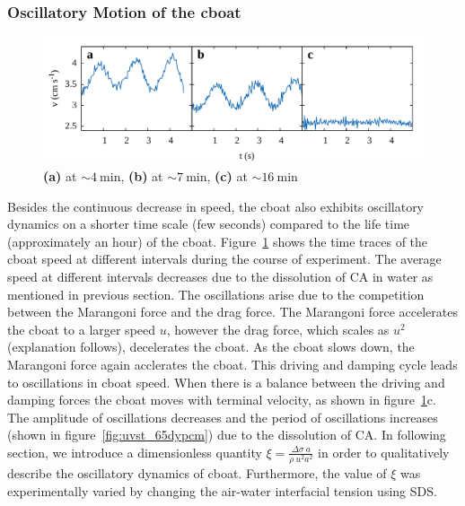 \documentclass[journal=langd5, manuscript=article, layout=twocolumn]{achemso}
\begin{document}
\subsubsection{Oscillatory Motion of the cboat}
\label{sec:oscboat}
\begin{figure}[ht]
	\centering
	\includegraphics[width=\textwidth]{uvst_72dypcm.pdf}
	\caption{{\bf (a)} at $\sim 4\ \mathrm{min}$, {\bf (b)} at $\sim 7\ \mathrm{min}$, {\bf (c)} at $\sim 16\ \mathrm{min}$}
\label{fig:uvst_72dypcm}
\end{figure}
Besides the continuous decrease in speed, the cboat also exhibits oscillatory dynamics on a shorter time scale (few seconds) compared to the life time (approximately an hour) of the cboat. Figure~\ref{fig:uvst_72dypcm} shows the time traces of the cboat speed at different intervals during the course of experiment. The average speed at different intervals decreases due to the dissolution of CA in water as mentioned in previous section. The oscillations arise due to the competition between the Marangoni force and the drag force. The Marangoni force accelerates the cboat to a larger speed $u$, however the drag force, which scales as $u^{2}$ (explanation follows), decelerates the cboat. As the cboat slows down, the Marangoni force again acclerates the cboat. This driving and damping cycle leads to oscillations in cboat speed. When there is a balance between the driving and damping forces the cboat moves with terminal velocity, as shown in figure~\ref{fig:uvst_72dypcm}c. The amplitude of oscillations decreases and the period of oscillations increases (shown in figure~\ref{fig:uvst_65dypcm}) due to the dissolution of CA. In following section, we introduce a dimensionless quantity $\xi = \frac{\Delta\sigma\ a}{\rho\ u^{2} a^{2}}$ in order to qualitatively describe the oscillatory dynamics of cboat. Furthermore, the value of $\xi$ was experimentally varied by changing the air-water interfacial tension using SDS.
\end{document}
